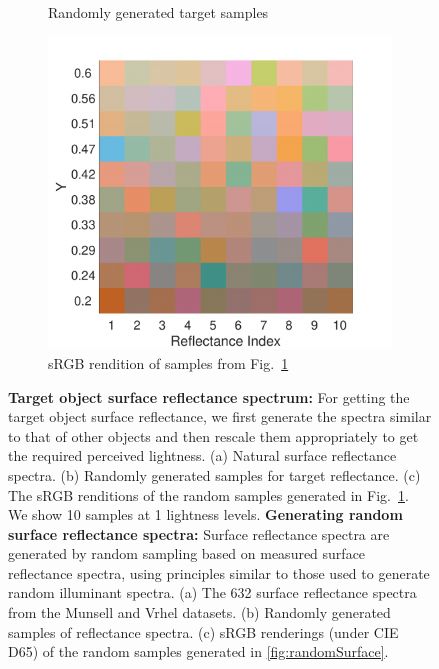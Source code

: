 \documentclass{jov}
\begin{document}
\begin{figure}
\begin{subfigure}[b]{0.3\textwidth}
        \caption{Randomly generated target samples}
        \label{fig:randomSurfaceTarget}
    \end{subfigure}
    \begin{subfigure}[b]{0.3 \textwidth}
    \centering
        \includegraphics[width=\textwidth]{../Figures/Figure8/Figure8_c.pdf}
        \caption{sRGB rendition of samples from Fig.~\ref{fig:randomSurfaceTarget}}
        \label{fig:sRGBSurfaceTarget}
    \end{subfigure}
    \caption{{\bf Target object surface reflectance spectrum:} For getting the target object surface reflectance, we first generate the spectra similar to that of other objects and then rescale them appropriately to get the required perceived lightness. (a) Natural surface reflectance spectra. (b) Randomly generated samples for target reflectance. (c) The sRGB renditions of the random samples generated in Fig.~\ref{fig:randomSurfaceTarget}. We show 10 samples at 1 lightness levels. \newline
{\bf Generating random surface reflectance spectra:} Surface reflectance spectra are generated by random sampling based on measured surface reflectance spectra, using principles similar to those used to generate random illuminant spectra. (a) The 632 surface reflectance spectra from the Munsell and Vrhel datasets. (b) Randomly generated samples of reflectance spectra. (c) sRGB renderings (under CIE D65) of the random samples generated in \ref{fig:randomSurface}.}\label{fig:surfaceReflectanceGeneration}
\end{figure}
\end{document}
